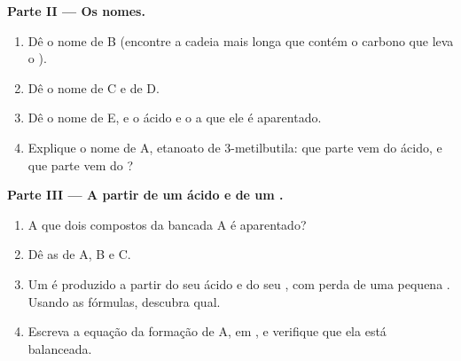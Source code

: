 \begin{problem}
\medskip
\noindent\textbf{Parte II --- Os nomes.}
\begin{enumerate}[resume]
  \item Dê o nome de B (encontre a cadeia mais longa que contém o
        carbono que leva o ).
  \item Dê o nome de C e de D.
  \item Dê o nome de E, e o ácido e o  a que ele é aparentado.
  \item Explique o nome de A, etanoato de 3-metilbutila: que parte vem
        do ácido, e que parte vem do ?
\end{enumerate}

\medskip
\noindent\textbf{Parte III --- A partir de um ácido e de um .}
\begin{enumerate}[resume]
  \item A que dois compostos da bancada A é aparentado?
  \item Dê as  de A, B e C.
  \item Um  é produzido a partir do seu ácido e do seu , com
        perda de uma pequena . Usando as fórmulas, descubra qual.
  \item Escreva a equação da formação de A, em , e
        verifique que ela está balanceada.
\end{enumerate}


\end{problem}
